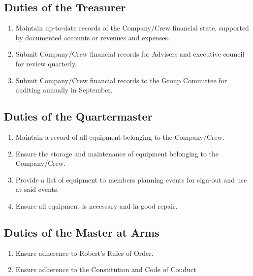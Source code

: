 \documentclass{Service_Corps_Document}
\begin{document}
\subsection{Duties of the Treasurer}
\begin{enumerate}
	\item Maintain up-to-date records of the Company/Crew financial state, supported by documented accounts or revenues and expenses.
	\item Submit Company/Crew financial records for Advisers and executive council for review quarterly.
	\item Submit Company/Crew financial records to the Group Committee for auditing annually in September. 
\end{enumerate}
\subsection{Duties of the Quartermaster}
\begin{enumerate}
	\item Maintain a record of all equipment belonging to the Company/Crew.
	\item Ensure the storage and maintenance of equipment belonging to the Company/Crew.
	\item Provide a list of equipment to members planning events for sign-out and use at said events.
	\item Ensure all equipment is necessary and in good repair. 
\end{enumerate}
\subsection{Duties of the Master at Arms}
\begin{enumerate}
	\item Ensure adherence to Robert's Rules of Order.
	\item Ensure adherence to the Constitution and Code of Conduct.
\end{enumerate}
\end{document}
